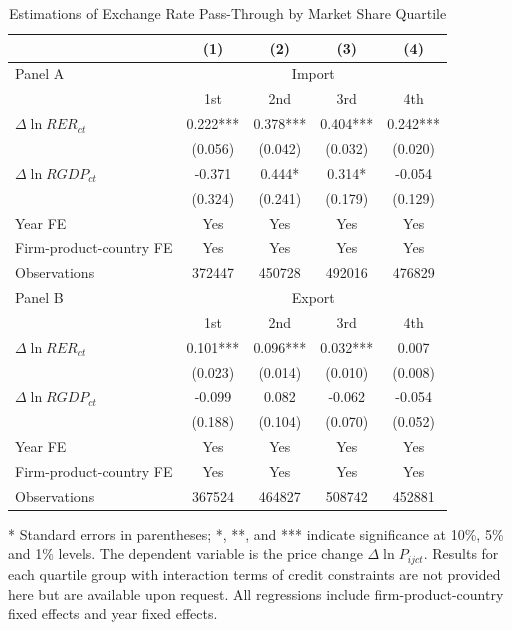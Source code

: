 \documentclass[12pt]{article}
\begin{document}
\begin{table}[htbp]
	\centering
	\caption{Estimations of Exchange Rate Pass-Through by Market Share Quartile}
	\begin{threeparttable}
		\begin{tabular}{lcccc}
			\toprule
			& (1)   & (2)   & (3)   & (4) \\
			\midrule
			Panel A & \multicolumn{4}{c}{Import} \\
			& 1st   & 2nd   & 3rd   & 4th \\
			\midrule
			$\Delta \ln RER_{ct}$ & 0.222*** & 0.378*** & 0.404*** & 0.242*** \\
			& (0.056) & (0.042) & (0.032) & (0.020) \\
			$\Delta \ln RGDP_{ct}$ & -0.371 & 0.444* & 0.314* & -0.054 \\
			& (0.324) & (0.241) & (0.179) & (0.129) \\
			Year FE  & Yes   & Yes   & Yes   & Yes \\
			Firm-product-country FE & Yes   & Yes   & Yes   & Yes \\
			Observations & 372447 & 450728 & 492016 & 476829 \\
			\midrule
			Panel B & \multicolumn{4}{c}{Export} \\
			& 1st   & 2nd   & 3rd   & 4th \\
			\midrule
			$\Delta \ln RER_{ct}$ & 0.101*** & 0.096*** & 0.032*** & 0.007 \\
			& (0.023) & (0.014) & (0.010) & (0.008) \\
			$\Delta \ln RGDP_{ct}$ & -0.099 & 0.082 & -0.062 & -0.054 \\
			& (0.188) & (0.104) & (0.070) & (0.052) \\
			Year FE  & Yes   & Yes   & Yes   & Yes \\
			Firm-product-country FE & Yes   & Yes   & Yes   & Yes \\
			Observations & 367524 & 464827 & 508742 & 452881 \\
			\bottomrule
		\end{tabular}
		\begin{tablenotes}
			\footnotesize
			\item[*] Standard errors in parentheses; *, **, and *** indicate significance at 10\%, 5\% and 1\% levels. The dependent variable is the price change $\Delta \ln P_{ijct}$. Results for each quartile group with interaction terms of credit constraints are not provided here but are available upon request. All regressions include firm-product-country fixed effects and year fixed effects.
		\end{tablenotes}
	\end{threeparttable}
	\label{tab.share.quartile}
\end{table}
\end{document}
